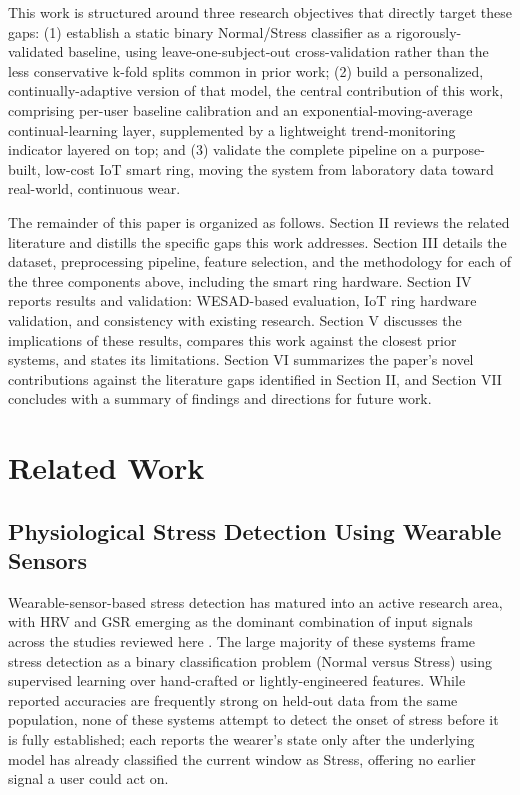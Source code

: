 \documentclass[conference]{IEEEtran}
\begin{document}
This work is structured around three research objectives that
directly target these gaps: (1) establish a static binary
Normal/Stress classifier as a rigorously-validated baseline,
using leave-one-subject-out cross-validation rather than the
less conservative k-fold splits common in prior work; (2)
build a personalized, continually-adaptive version of that
model, the central contribution of this work, comprising
per-user baseline calibration and an exponential-moving-average
continual-learning layer, supplemented by a lightweight
trend-monitoring indicator layered on top; and (3) validate
the complete pipeline on a purpose-built, low-cost IoT smart
ring, moving the system from laboratory data toward
real-world, continuous wear.

The remainder of this paper is organized as follows. Section
II reviews the related literature and distills the specific
gaps this work addresses. Section III details the dataset,
preprocessing pipeline, feature selection, and the methodology
for each of the three components above, including the smart
ring hardware. Section IV reports results and validation:
WESAD-based evaluation, IoT ring hardware validation, and
consistency with existing research. Section V discusses the
implications of
these results, compares this work against the closest prior
systems, and states its limitations. Section VI summarizes
the paper's novel contributions against the literature gaps
identified in Section II, and Section VII concludes with a
summary of findings and directions for future work.

\section{Related Work}

\subsection{Physiological Stress Detection Using
Wearable Sensors}
Wearable-sensor-based stress detection has matured into an
active research area, with HRV and GSR emerging as the
dominant combination of input signals across the studies
reviewed here \cite{b1}\cite{b3}\cite{b4}\cite{b14}. The
large majority of these systems frame stress detection as a
binary classification problem (Normal versus Stress) using
supervised learning over hand-crafted or lightly-engineered
features. While reported accuracies are frequently strong on
held-out data from the same population, none of these systems
attempt to detect the onset of stress before it is fully
established; each reports the wearer's state only after the
underlying model has already classified the current window as
Stress, offering no earlier signal a user could act on.
\end{document}
